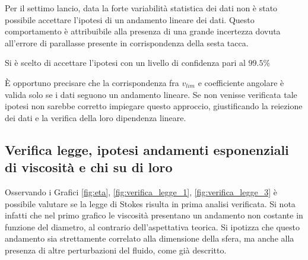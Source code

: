 \documentclass[a4paper,11pt,oneside]{article}
\begin{document}
Per il settimo lancio, data la forte variabilità statistica dei dati non è stato possibile accettare l'ipotesi di un andamento lineare dei dati. Questo comportamento è attribuibile alla presenza di una grande incertezza dovuta all'errore di parallasse presente in corrispondenza della sesta tacca.

Si è scelto di accettare l'ipotesi con un livello di confidenza pari al $99.5\%$

È opportuno precisare che la corrispondenza fra $v_{lim}$ e coefficiente angolare è valida solo se i dati seguono un andamento lineare. Se non venisse verificata tale ipotesi non sarebbe corretto impiegare questo approccio, giustificando la reiezione dei dati e la verifica della loro dipendenza lineare.


\subsection{Verifica legge, ipotesi andamenti esponenziali di viscosità e chi su di loro} 




Osservando i Grafici \ref{fig:eta}, \ref{fig:verifica_legge_1}, \ref{fig:verifica_legge_3} è possibile valutare se la legge di Stokes risulta in prima analisi verificata.
Si nota infatti che nel primo grafico le viscosità presentano un andamento non costante in funzione del diametro, al contrario dell'aspettativa teorica. Si ipotizza che questo andamento sia strettamente correlato alla dimensione della sfera, ma anche alla presenza di altre perturbazioni del fluido, come già descritto.\newline
\end{document}

